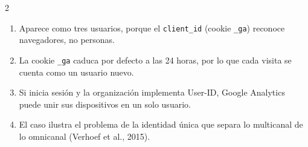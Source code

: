\documentclass[10pt,letterpaper]{article}
\newcommand{\cas}{\framebox[1.0em]{\rule{0pt}{1.05ex}}}
\begin{document}
\begin{multicols}{2}
\begin{minipage}[t]{\columnwidth}
\begin{enumerate}[label=\cas\ \alph*),leftmargin=2.3em,itemsep=1.2pt,topsep=1pt,parsep=0pt,partopsep=0pt]
\item Aparece como tres usuarios, porque el \texttt{client\_id} (cookie \texttt{\_ga}) reconoce navegadores, no personas.
\item La cookie \texttt{\_ga} caduca por defecto a las 24 horas, por lo que cada visita se cuenta como un usuario nuevo.
\item Si inicia sesión y la organización implementa User-ID, Google Analytics puede unir sus dispositivos en un solo usuario.
\item El caso ilustra el problema de la identidad única que separa lo multicanal de lo omnicanal (Verhoef et al., 2015).
\end{enumerate}\end{minipage}\par\vspace{3pt}
\end{multicols}
\end{document}
